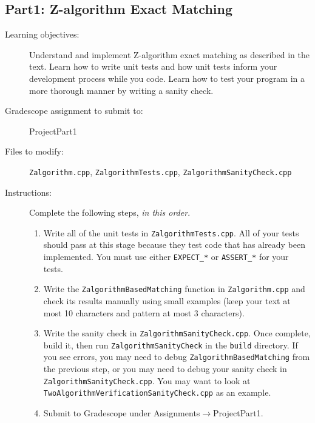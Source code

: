 \documentclass[paper=a4, fontsize=11pt]{scrartcl} %
\numberwithin{equation}{section} %
\numberwithin{figure}{section} %
\numberwithin{table}{section} %
\begin{document}
\subsection*{Part1: Z-algorithm Exact Matching}
\begin{description}
	\item[Learning objectives:] Understand and implement Z-algorithm exact matching as described in the text. Learn how to write unit tests and how unit tests inform your development process while you code. Learn how to test your program in a more thorough manner by writing a sanity check.
	\item[Gradescope assignment to submit to:] ProjectPart1
	\item[Files to modify:] \texttt{Zalgorithm.cpp}, \texttt{ZalgorithmTests.cpp}, \texttt{ZalgorithmSanityCheck.cpp}
	\item[Instructions:] Complete the following steps, \textit{in this order}.
		\begin{enumerate}
			\item Write all of the unit tests in \texttt{ZalgorithmTests.cpp}. All of your tests should pass at this stage because they test code that has already been implemented. You must use either \texttt{EXPECT\_*} or \texttt{ASSERT\_*} for your tests.
			\item Write the \texttt{ZalgorithmBasedMatching} function in \texttt{Zalgorithm.cpp} and check its results manually using small examples (keep your text at most 10 characters and pattern at most 3 characters).
			\item Write the sanity check in \texttt{ZalgorithmSanityCheck.cpp}. Once complete, build it, then run \texttt{ZalgorithmSanityCheck} in the \texttt{build} directory. If you see errors, you may need to debug \texttt{ZalgorithmBasedMatching} from the previous step, or you may need to debug your sanity check in \texttt{ZalgorithmSanityCheck.cpp}. You may want to look at \texttt{TwoAlgorithmVerificationSanityCheck.cpp} as an example.
			\item Submit to Gradescope under Assignments$\to$ProjectPart1.
		\end{enumerate}
\end{description}
\end{document}
